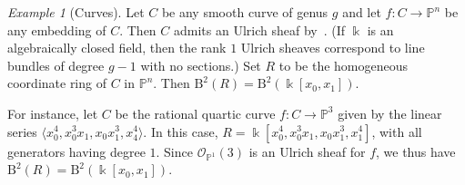 \documentclass[12pt]{amsart}
\theoremstyle{definition}
\theoremstyle{remark}
\newtheorem{example}[lemma]{Example}
\newcommand{\kk}{\Bbbk}
\newcommand{\PP}{\mathbb{P}}
\newcommand{\cO}{\mathcal{O}}
\newcommand{\BBQ}{\mathrm{B}}
\begin{document}
\begin{example}[Curves]\label{ex:res over section ring of ell curve}
Let $C$ be any smooth curve of genus $g$ and let $f\colon C\to \PP^n$ be any embedding of $C$.  Then $C$ admits an Ulrich sheaf by~\cite[Corollary~4.5]{eis-schrey-chow}.  (If $\kk$ is an algebraically closed field, then the rank $1$ Ulrich sheaves correspond to line bundles of degree $g-1$ with no sections.)  Set $R$ to be the homogeneous coordinate ring of $C$ in $\PP^n$.  Then $\BBQ^2(R)=\BBQ^2(\kk[x_0,x_1])$.

For instance, let $C$ be the rational quartic curve $f\colon C\to \PP^3$ given by the linear series $\langle x_0^4,x_0^3x_1,x_0x_1^3,x_4^4\rangle$.  In this case, $R=\kk[x_0^4,x_0^3x_1,x_0x_1^3,x_1^4]$, with all generators having degree $1$.  Since $\cO_{\PP^1}(3)$ is an Ulrich sheaf for $f$, we thus have $\BBQ^2(R)=\BBQ^2(\kk[x_0,x_1])$.  
\end{example}
%
%
\end{document}
